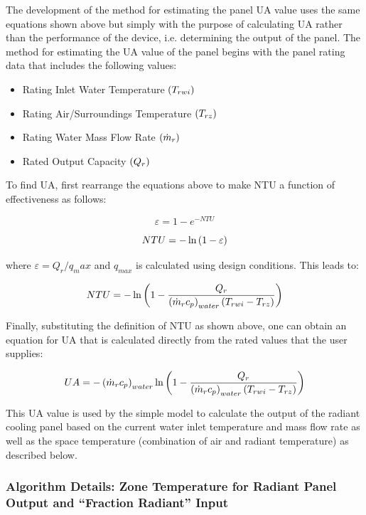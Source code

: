 The development of the method for estimating the panel UA value uses the same equations shown above but simply with the purpose of calculating UA rather than the performance of the device, i.e. determining the output of the panel.  The method for estimating the UA value of the panel begins with the panel rating data that includes the following values:

\begin{itemize}
\tightlist
\item
  Rating Inlet Water Temperature $\left(T_{rwi}\right)$
\item
  Rating Air/Surroundings Temperature $\left(T_{rz}\right)$
\item
  Rating Water Mass Flow Rate $\left(\dot{m}_r\right)$
\item
  Rated Output Capacity $\left(Q_r\right)$
\end{itemize}

To find UA, first rearrange the equations above to make NTU a function of effectiveness as follows:

\begin{equation}
\varepsilon = 1 - e^{-NTU}
\end{equation}

\begin{equation}
NTU = -\ln{\left(1-\varepsilon\right)}
\end{equation}

where $\varepsilon = {Q_r}/{q_max}$ and \(q_{max}\) is calculated using design conditions.  This leads to:

\begin{equation}
NTU = -\ln{\left(1-\frac{Q_r}{\left(\dot{m}_r c_p\right)_{water}\left(T_{rwi}-T_{rz}\right)}\right)}
\end{equation}

Finally, substituting the definition of NTU as shown above, one can obtain an equation for UA that is calculated directly from the rated values that the user supplies:

\begin{equation}
UA = -\left(\dot{m}_r c_p\right)_{water} \ln{\left(1-\frac{Q_r}{\left(\dot{m}_r c_p\right)_{water}\left(T_{rwi}-T_{rz}\right)}\right)}
\end{equation}

This UA value is used by the simple model to calculate the output of the radiant cooling panel based on the current water inlet temperature and mass flow rate as well as the space temperature (combination of air and radiant temperature) as described below.

\subsubsection{Algorithm Details: Zone Temperature for Radiant Panel Output and “Fraction Radiant” Input}\label{algoithm-details-zone-temperature-for-radiant-panel-and-fraction-radiant-input}

